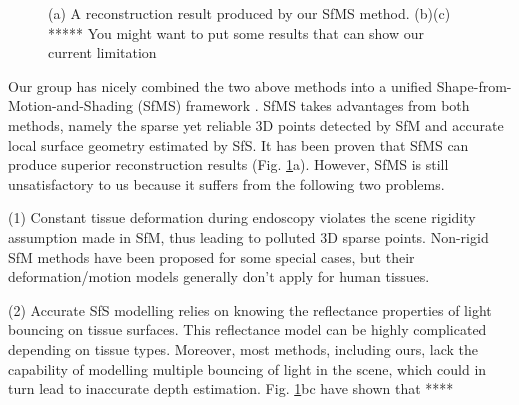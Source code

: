 \documentclass{llncs}
\begin{document}
\begin{figure}[!b]
  \centering
  \caption{(a) A reconstruction result produced by our SfMS method. (b)(c) ***** You might want to put some results that can show our current limitation}
  \label{fig:sfms_result}
\end{figure}

Our group has nicely combined the two above methods into a unified Shape-from-Motion-and-Shading (SfMS) framework \cite{price16}. SfMS takes advantages from both methods, namely the sparse yet reliable 3D points detected by SfM and accurate local surface geometry estimated by SfS. It has been proven that SfMS can produce superior reconstruction results (Fig. \ref{fig:sfms_result}a). However, SfMS is still unsatisfactory to us because it suffers from the following two problems.

(1) Constant tissue deformation during endoscopy violates the scene rigidity assumption made in SfM, thus leading to polluted 3D sparse points. Non-rigid SfM methods have been proposed for some special cases, but their deformation/motion models generally don't apply for human tissues.

(2) Accurate SfS modelling relies on knowing the reflectance properties of light bouncing on tissue surfaces. This reflectance model can be highly complicated depending on tissue types. Moreover, most methods, including ours, lack the capability of modelling multiple bouncing of light in the scene, which could in turn lead to inaccurate depth estimation. Fig. \ref{fig:sfms_result}bc have shown that ****
\end{document}
